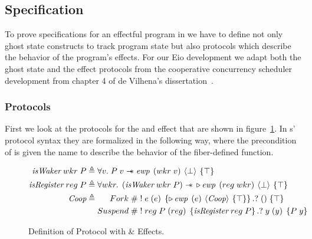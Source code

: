 \subsection{Specification}
\label{sec:sched-spec}

To prove specifications for an effectful program in \hazel{} we have to define not only ghost state constructs to track program state but also protocols which describe the behavior of the program's effects.
For our Eio development we adapt both the ghost state and the effect protocols from the cooperative concurrency scheduler development from chapter 4 of de Vilhena's dissertation~\cite{de2022proof}.

\subsubsection{Protocols}
\label{sec:sched-spec-protocols}

First we look at the protocols for the \efork{} and \esuspend{} effect that are shown in figure~\ref{fig:coop-protocol-simpl}.
In \hazel{}s' protocol syntax they are formalized in the following way, where the precondition of \esuspend{} is given the name \gsIsReg{} to describe the behavior of the fiber-defined  function.

\begin{figure}[ht]
  \begin{align*}
    \gsIsWaker{}\; wkr\; P & \triangleq \forall v.   \;  P\; v \wand{} \ewp{wkr\; v}{\bot}{\top}                                                                       \\
    \gsIsReg{}\; reg\; P   & \triangleq \forall wkr. \; \left( \gsIsWaker{}\; wkr\; P \right) \wand{} \later \ewp{reg\; wkr}{\bot}{\top}                               \\
    \proto{}               & \triangleq \begin{aligned}[t]
                                          Fork\;    & \# \; !\; e\; (e)\; \left\{\later \ewp{e}{\proto{}}{\top}\right\}. ?\; ()\; \{ \top \}               \\
                                          Suspend\; & \# \; !\; reg\; P\; (reg)\; \left\{\gsIsReg{}\; reg\; P\right\}.?\; y\; (y)\; \left\{ P\; y \right\}
                                        \end{aligned}
  \end{align*}
  \caption{Definition of \proto{} Protocol with \efork{} \& \esuspend{} Effects.}
  \label{fig:coop-protocol-simpl}
\end{figure}

